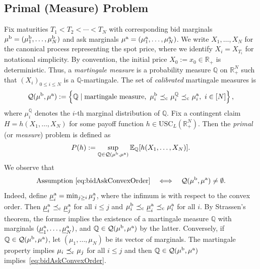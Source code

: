 \documentclass[11pt]{article}
\newcommand{\cQ}{\mathcal{Q}}
\newcommand{\R}{\mathbb{R}} %
\newcommand{\Q}{\mathbb{Q}} %
\theoremstyle{plain}
\theoremstyle{definition}
\theoremstyle{remark}
\newcommand{\E}{\mathbb{E}}
\DeclareMathOperator{\cleq}{\,\preceq_{\rm c}\,}
\theoremstyle{plain}
\begin{document}
\subsection{Primal (Measure) Problem}
Fix maturities $T_1<  T_2 <  \cdots  <  T_N$ with corresponding bid marginals $\mu^{\rm b}=(\mu^{\rm b}_1,\dots,\mu^{\rm b}_N)$ and ask marginals $\mu^{\rm a}=(\mu^{\rm a}_1,\dots,\mu^{\rm a}_N)$. We write $X_1, \dots, X_N$ for the canonical process representing the spot price, where we identify $X_i=X_{T_i}$ for notational simplicity. By convention, the initial price $X_0:=x_0\in\R_+$ is deterministic. Thus, a \emph{martingale measure} is a probability measure $\Q$ on $\R_+^N$ such that $(X_i)_{0\leq i\leq N}$ is a $\Q$-martingale. The set of \emph{calibrated} martingale measures is
\begin{equation}\label{eq:martingale-couplings}
    \cQ(\mu^{\rm b}, \mu^{\rm a}):= \left\{\Q \mid \text{martingale measure}, \,\, \mu_i^{\rm b}\cleq \mu_i^{\Q}\cleq \mu_i^{\rm a},\,\, i \in [N]\right\},
\end{equation}
where $\mu_i^{\Q}$ denotes the $i$-th marginal distribution of  $\Q$. 
Fix a contingent claim $H = h(X_1, \ldots, X_N)$ for some   payoff function $h\in \text{USC}_L(\R^N_+)$. Then the \emph{primal} (or \emph{measure}) problem is defined as
\begin{equation}\label{eq:BAMOT-primal}
            P(h):=\sup_{\Q \in \cQ(\mu^{\rm b}, \mu^{\rm a})} \E_\Q[h(X_1, \ldots, X_N)].
\end{equation}
We observe that 
\[
    \text{Assumption } \eqref{eq:bidAskConvexOrder} \quad \Longleftrightarrow \quad \cQ(\mu^{\rm b}, \mu^{\rm a})\neq \emptyset.
\]
Indeed, define $\underline{\mu}_i^{\rm a}=\min_{j\geq i}\mu_j^{\rm a}$, where the infimum is with respect to the convex order. Then $\underline{\mu}_i^{\rm a}\cleq \underline{\mu}_j^{\rm a}$ for all $i \leq j$ and $\mu_i^{\rm b}\cleq \underline{\mu}_i^{\rm a}\cleq \mu_i^{\rm a}$ for all $i$. By Strassen's theorem, the former implies the existence of a martingale measure $\Q$ with marginals $(\underline{\mu}_1^{\rm a},\dots,\underline{\mu}_N^{\rm a})$, and $\Q\in \cQ(\mu^{\rm b}, \mu^{\rm a})$ by the latter. Conversely, if $\Q\in \cQ(\mu^{\rm b}, \mu^{\rm a})$, let $(\mu_1,\dots,\mu_N)$ be its vector of marginals. The martingale property implies $\mu_i\cleq \mu_j$ for all $i \leq j$ and then $\Q\in \cQ(\mu^{\rm b}, \mu^{\rm a})$ implies~\eqref{eq:bidAskConvexOrder}.     
%
\end{document}
